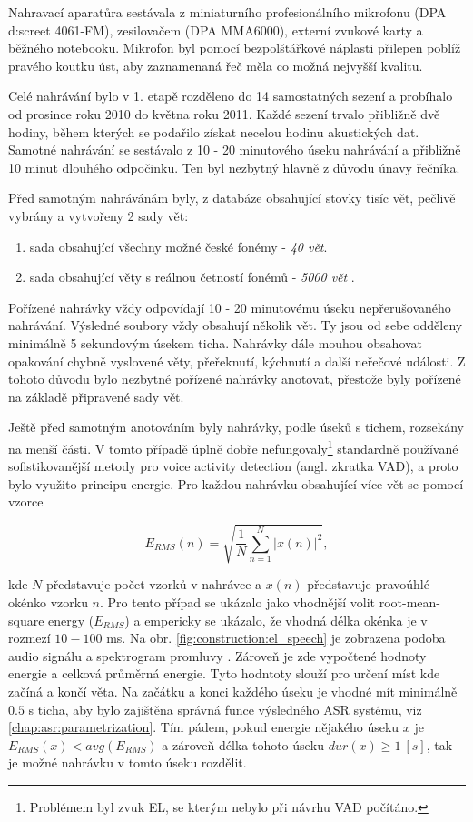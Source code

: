 Nahravací aparatůra sestávala z miniaturního profesionálního mikrofonu (DPA d:screet 4061-FM), zesilovačem (DPA MMA6000), externí zvukové karty a běžného notebooku. Mikrofon byl pomocí bezpolštářkové náplasti přilepen poblíž pravého koutku úst, aby zaznamenaná řeč měla co možná nejvyšší kvalitu.

Celé nahrávání bylo v 1. etapě rozděleno do 14 samostatných sezení a probíhalo od prosince roku 2010 do května roku 2011. Každé sezení trvalo přibližně dvě hodiny, během kterých se podařilo získat necelou hodinu akustických dat. Samotné nahrávání se sestávalo z 10 - 20 minutového úseku nahrávání a přibližně 10 minut dlouhého odpočinku. Ten byl nezbytný hlavně z důvodu únavy řečníka.

Před samotným nahrávánám byly, z databáze obsahující stovky tisíc vět, pečlivě vybrány a vytvořeny 2 sady vět:

\begin{enumerate}
  \item sada obsahující všechny možné české fonémy - \textit{40 vět}.
  \item sada obsahující věty s reálnou četností fonémů - \textit{5000 vět} \cite{Radova2000}.
\end{enumerate}

\noindent Pořízené nahrávky vždy odpovídají 10 - 20 minutovému úseku nepřerušovaného nahrávání. Výsledné soubory vždy obsahují několik vět. Ty jsou od sebe odděleny minimálně 5 sekundovým úsekem ticha. Nahrávky dále mouhou obsahovat opakování chybně vyslovené věty, přeřeknutí, kýchnutí a další neřečové události. Z tohoto důvodu bylo nezbytné pořízené nahrávky anotovat, přestože byly pořízené na základě připravené sady vět.

Ještě před samotným anotováním byly nahrávky, podle úseků s tichem, rozsekány na menší části. V tomto případě úplně dobře nefungovaly\footnote{Problémem byl zvuk EL, se kterým nebylo při návrhu VAD počítáno.} standardně používané sofistikovanější metody pro voice activity detection (angl. zkratka VAD), a proto bylo využito principu energie. Pro každou nahrávku obsahující více vět se pomocí vzorce

\begin{equation}
  \label{eq:construction:energy}
  E_{RMS}(n) = \sqrt{\frac{1}{N} \sum_{n=1}^{N} \left| x(n) \right|^2},
\end{equation}

\noindent kde $N$ představuje počet vzorků v nahrávce a $x(n)$ představuje pravoúhlé okénko vzorku $n$. Pro tento případ se ukázalo jako vhodnější volit root-mean-square energy ($E_{RMS}$) a empericky se ukázalo, že vhodná délka okénka je v rozmezí $10 - 100$ ms. Na obr. \ref{fig:construction:el_speech} je zobrazena podoba audio signálu a spektrogram promluvy \textit{}. Zároveň je zde vypočtené hodnoty energie a celková průměrná energie. Tyto hodntoty slouží pro určení míst kde začíná a končí věta. Na začátku a konci každého úseku je vhodné mít minimálně $0.5$ s ticha, aby bylo zajištěna správná funce výsledného ASR systému, viz \ref{chap:asr:parametrization}. Tím pádem, pokud energie nějakého úseku $x$ je $E_{RMS}(x) < avg(E_{RMS})$ a zároveň délka tohoto úseku $dur(x) \geq 1\ [s]$, tak je možné nahrávku v tomto úseku rozdělit.

